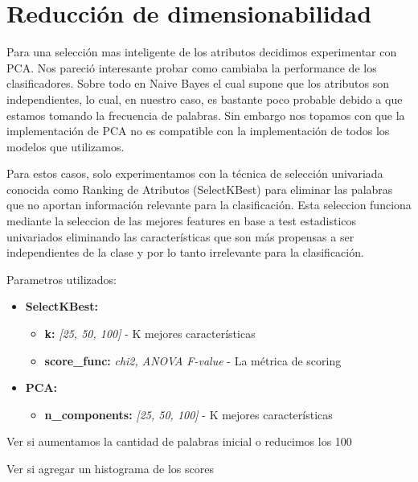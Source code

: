 \section{Reducción de dimensionabilidad}

Para una selección mas inteligente de los atributos decidimos experimentar con PCA. Nos pareció interesante probar como cambiaba la performance de los clasificadores. Sobre todo en Naive Bayes el cual supone que los atributos son independientes, lo cual, en nuestro caso, es bastante poco probable debido a que estamos tomando la frecuencia de palabras. Sin embargo nos topamos con que la implementación de PCA no es compatible con la implementación de todos los modelos que utilizamos. 


Para estos casos, solo experimentamos con la técnica de selección univariada conocida como Ranking de Atributos (SelectKBest) para eliminar las palabras que no aportan información relevante para la clasificación. Esta seleccion funciona mediante la seleccion de las mejores features en base a test estadisticos univariados eliminando las características que son más propensas a ser independientes de la clase y por lo tanto irrelevante para la clasificación.
  
  
Parametros utilizados:

\begin{itemize}
\item \textbf{SelectKBest:} 
	\begin{itemize}
	\item \textbf{k:} \textit{[25, 50, 100]} - K mejores características
	\item \textbf{score\_func:} \textit{chi2, ANOVA F-value} - La métrica de scoring
	\end{itemize}


\item \textbf{PCA: } 
	\begin{itemize}
	\item \textbf{n\_components:} \textit{[25, 50, 100]} - K mejores características
	\end{itemize}
\end{itemize}



{\Large Ver si aumentamos la cantidad de palabras inicial o reducimos los 100}

{\Large Ver si agregar un histograma de los scores}
